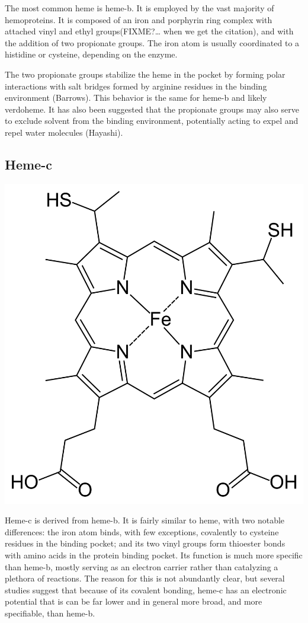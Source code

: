 \documentclass[a4paper, nobind]{templates/ociamthesis}
\let\origfigure\figure
\let\endorigfigure\endfigure
\renewenvironment{figure}[1][2] {
    \expandafter\origfigure\expandafter[H]
} {
    \endorigfigure
}
\begin{document}
The most common heme is heme-b. It is employed by the vast majority of hemoproteins. It is composed of an iron and porphyrin ring complex with attached vinyl and ethyl groups(FIXME?\ldots{} when we get the citation), and with the addition of two propionate groups. The iron atom is usually coordinated to a histidine or cysteine, depending on the enzyme.

The two propionate groups stabilize the heme in the pocket by forming polar interactions with salt bridges formed by arginine residues in the binding environment (Barrows). This behavior is the same for heme-b and likely verdoheme. It has also been suggested that the propionate groups may also serve to exclude solvent from the binding environment, potentially acting to expel and repel water molecules (Hayashi).

\hypertarget{heme-c}{%
\subsection{Heme-c}\label{heme-c}}

\begin{figure}

{\centering \includegraphics[width=0.5\linewidth]{figures/HEC} 

}

\caption{Heme-c (HEC)}\label{fig:structHEC}
\end{figure}

Heme-c is derived from heme-b. It is fairly similar to heme, with two notable differences: the iron atom binds, with few exceptions, covalently to cysteine residues in the binding pocket; and its two vinyl groups form thioester bonds with amino acids in the protein binding pocket. Its function is much more specific than heme-b, mostly serving as an electron carrier rather than catalyzing a plethora of reactions. The reason for this is not abundantly clear, but several studies suggest that because of its covalent bonding, heme-c has an electronic potential that is can be far lower and in general more broad, and more specifiable, than heme-b. \autocite{Bowman2008,Kleingardner2015}
\end{document}
